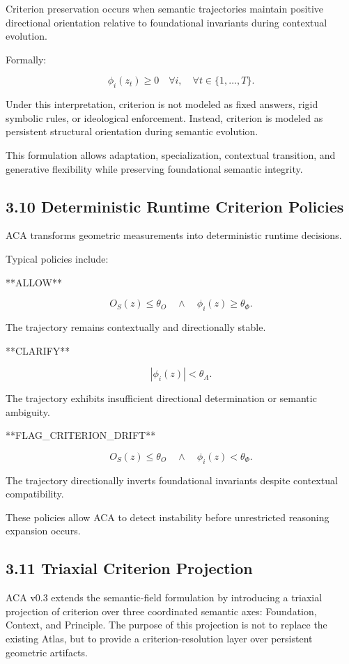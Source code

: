 \documentclass[11pt]{article}
\begin{document}
Criterion preservation occurs when semantic trajectories maintain positive directional orientation relative to foundational invariants during contextual evolution.

Formally:

$$
\phi_i(z_t)\geq 0
\quad
\forall i,\quad
\forall t\in\{1,\dots,T\}.
$$

Under this interpretation, criterion is not modeled as fixed answers, rigid symbolic rules, or ideological enforcement. Instead, criterion is modeled as persistent structural orientation during semantic evolution.

This formulation allows adaptation, specialization, contextual transition, and generative flexibility while preserving foundational semantic integrity.

\subsection{3.10 Deterministic Runtime Criterion Policies}

ACA transforms geometric measurements into deterministic runtime decisions.

Typical policies include:

**ALLOW**

$$
O_S(z)\leq\theta_O
\quad\wedge\quad
\phi_i(z)\geq\theta_\Phi.
$$

The trajectory remains contextually and directionally stable.

**CLARIFY**

$$
|\phi_i(z)|<\theta_A.
$$

The trajectory exhibits insufficient directional determination or semantic ambiguity.

**FLAG\_CRITERION\_DRIFT**

$$
O_S(z)\leq\theta_O
\quad\wedge\quad
\phi_i(z)<\theta_\Phi.
$$

The trajectory directionally inverts foundational invariants despite contextual compatibility.

These policies allow ACA to detect instability before unrestricted reasoning expansion occurs.

\subsection{3.11 Triaxial Criterion Projection}

ACA v0.3 extends the semantic-field formulation by introducing a triaxial projection of criterion over three coordinated semantic axes: Foundation, Context, and Principle. The purpose of this projection is not to replace the existing Atlas, but to provide a criterion-resolution layer over persistent geometric artifacts.
\end{document}
